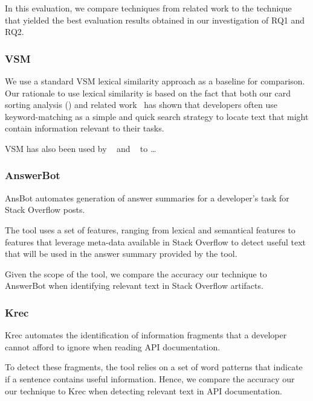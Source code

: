 In this evaluation, we compare techniques from related work to the technique that yielded the best evaluation results obtained in our investigation of RQ1 and RQ2.


\subsubsection{VSM}



We use a standard VSM lexical similarity approach as a baseline for comparison. Our rationale to use 
lexical similarity is based on the fact that 
both our card sorting analysis () and related work~\cite{Ko2006a, Freund2015} has shown that developers often use keyword-matching as a simple and quick search strategy to locate text that might contain information relevant to their tasks.


VSM has also been used by ~\cite{Lin2021} and ~\cite{Ye2016} to \dots





\subsubsection{AnswerBot}


\acf{AnsBot} automates generation of answer summaries for a developer's task for Stack Overflow posts.

The tool uses a set of features, ranging from lexical and semantical features to features that leverage meta-data available in Stack Overflow to detect useful text that will be used in the answer summary provided by the tool. 

Given the scope of the tool, we compare the accuracy our technique to AnswerBot when identifying relevant text in 
Stack Overflow artifacts.


\subsubsection{Krec}


\acf{Krec} automates the identification of information fragments that a developer cannot afford to ignore when reading API documentation.

To detect these fragments, the tool relies on a set of word patterns that indicate if a sentence contains useful information. Hence, we compare the accuracy our our technique to Krec when detecting relevant text in API documentation.


